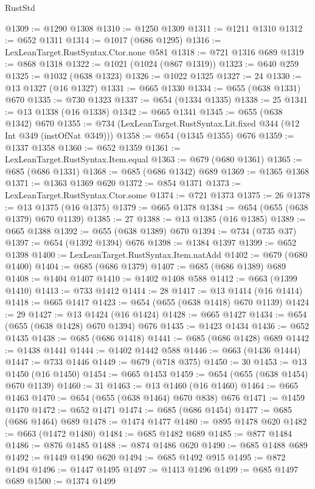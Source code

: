 \begin{lexlean}{RustStd}
\begin{coremodule}
@1309 := @1290 @1308
@1310 := @1250 @1309
@1311 := @1211 @1310
@1312 := @652 @1311
@1314 := @1017 (@686 @1295)
@1316 := LexLeanTarget.RustSyntax.Ctor.none @581
@1318 := @721 @1316 @689
@1319 := @868 @1318
@1322 := @1021 (@1024 (@867 @1319))
@1323 := @640 @259
@1325 := @1032 (@638 @1323)
@1326 := @1022 @1325
@1327 := 24
@1330 := @13 @1327 (@16 @1327)
@1331 := @665 @1330
@1334 := @655 (@638 @1331) @670
@1335 := @730 @1323
@1337 := @654 (@1334 @1335)
@1338 := 25
@1341 := @13 @1338 (@16 @1338)
@1342 := @665 @1341
@1345 := @655 (@638 @1342) @670
@1355 := @734 (LexLeanTarget.RustSyntax.Lit.fixed @344 (@12 Int @349 (instOfNat @349)))
@1358 := @654 (@1345 @1355) @676
@1359 := @1337 @1358
@1360 := @652 @1359
@1361 := LexLeanTarget.RustSyntax.Item.equal
@1363 := @679 (@680 @1361)
@1365 := @685 (@686 @1331)
@1368 := @685 (@686 @1342) @689
@1369 := @1365 @1368
@1371 := @1363 @1369 @620
@1372 := @854 @1371
@1373 := LexLeanTarget.RustSyntax.Ctor.some
@1374 := @721 @1373
@1375 := 26
@1378 := @13 @1375 (@16 @1375)
@1379 := @665 @1378
@1384 := @654 (@655 (@638 @1379) @670 @1139)
@1385 := 27
@1388 := @13 @1385 (@16 @1385)
@1389 := @665 @1388
@1392 := @655 (@638 @1389) @670
@1394 := @734 (@735 @37)
@1397 := @654 (@1392 @1394) @676
@1398 := @1384 @1397
@1399 := @652 @1398
@1400 := LexLeanTarget.RustSyntax.Item.natAdd
@1402 := @679 (@680 @1400)
@1404 := @685 (@686 @1379)
@1407 := @685 (@686 @1389) @689
@1408 := @1404 @1407
@1410 := @1402 @1408 @588
@1412 := @663 (@1399 @1410)
@1413 := @733 @1412
@1414 := 28
@1417 := @13 @1414 (@16 @1414)
@1418 := @665 @1417
@1423 := @654 (@655 (@638 @1418) @670 @1139)
@1424 := 29
@1427 := @13 @1424 (@16 @1424)
@1428 := @665 @1427
@1434 := @654 (@655 (@638 @1428) @670 @1394) @676
@1435 := @1423 @1434
@1436 := @652 @1435
@1438 := @685 (@686 @1418)
@1441 := @685 (@686 @1428) @689
@1442 := @1438 @1441
@1444 := @1402 @1442 @588
@1446 := @663 (@1436 @1444)
@1447 := @733 @1446
@1449 := @679 (@718 @375)
@1450 := 30
@1453 := @13 @1450 (@16 @1450)
@1454 := @665 @1453
@1459 := @654 (@655 (@638 @1454) @670 @1139)
@1460 := 31
@1463 := @13 @1460 (@16 @1460)
@1464 := @665 @1463
@1470 := @654 (@655 (@638 @1464) @670 @838) @676
@1471 := @1459 @1470
@1472 := @652 @1471
@1474 := @685 (@686 @1454)
@1477 := @685 (@686 @1464) @689
@1478 := @1474 @1477
@1480 := @895 @1478 @620
@1482 := @663 (@1472 @1480)
@1484 := @685 @1482 @689
@1485 := @877 @1484
@1486 := @876 @1485
@1488 := @874 @1486 @620
@1490 := @685 @1488 @689
@1492 := @1449 @1490 @620
@1494 := @685 @1492 @915
@1495 := @872 @1494
@1496 := @1447 @1495
@1497 := @1413 @1496
@1499 := @685 @1497 @689
@1500 := @1374 @1499

\end{coremodule}
\end{lexlean}
